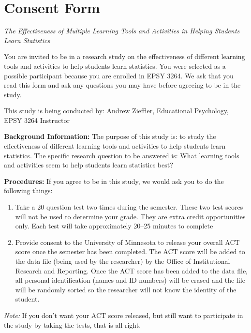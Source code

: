 \documentclass[11pt]{umnthesis}
\begin{document}
\hypertarget{appendix-b}{%
\chapter{Consent Form}\label{appendix-b}}

\emph{The Effectiveness of Multiple Learning Tools and Activities in Helping Students Learn Statistics}

\noindent You are invited to be in a research study on the effectiveness of different learning tools and activities to help students learn statistics. You were selected as a possible participant because you are enrolled in EPSY 3264. We ask that you read this form and ask any questions you may have before agreeing to be in the study.

\noindent This study is being conducted by: Andrew Zieffler, Educational Psychology, EPSY 3264 Instructor

\noindent \textbf{Background Information:} The purpose of this study is: to study the effectiveness of different learning tools and activities to help students learn statistics. The specific research question to be answered is: What learning tools and activities seem to help students learn statistics best?

\noindent \textbf{Procedures:} If you agree to be in this study, we would ask you to do the following things:

\begin{enumerate}
\def\labelenumi{(\arabic{enumi})}
\tightlist
\item
  Take a 20 question test two times during the semester. These two test scores will not be used to determine your grade. They are extra credit opportunities only. Each test will take approximately 20--25 minutes to complete
\item
  Provide consent to the University of Minnesota to release your overall ACT score once the semester has been completed. The ACT score will be added to the data file (being used by the researcher) by the Office of Institutional Research and Reporting. Once the ACT score has been added to the data file, all personal identification (names and ID numbers) will be erased and the file will be randomly sorted so the researcher will not know the identity of the student.
\end{enumerate}

\noindent \textit{Note:} If you don't want your ACT score released, but still want to participate in the study by taking the tests, that is all right.
\end{document}

